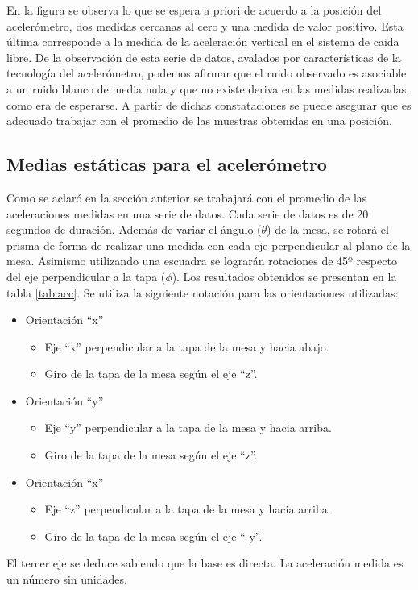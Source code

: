 \documentclass[main]{subfiles}
\begin{document}
En la figura se observa lo que se espera a priori de acuerdo a la posici\'on del aceler\'ometro, dos medidas cercanas al cero y una medida de valor positivo. Esta \'ultima corresponde a la medida de la aceleraci\'on vertical en el sistema de caida libre. De la observaci\'on de esta serie de datos, avalados por características de la tecnología del acelerómetro, podemos afirmar que el ruido observado es asociable a un ruido blanco de media nula y que no existe deriva en las medidas realizadas, como era de esperarse. A partir de dichas constataciones se puede asegurar que es adecuado trabajar con el promedio de las muestras obtenidas en una posici\'on.


\subsection{Medias estáticas para el acelerómetro}

Como se aclaró en la sección anterior se trabajará con el promedio de las aceleraciones medidas en una serie de datos. Cada serie de datos es de 20 segundos de duración. Además de variar el ángulo ($\theta$) de la mesa, se rotará el prisma de forma de realizar una medida con cada eje perpendicular al plano de la mesa. Asimismo utilizando una escuadra se lograrán rotaciones de 45º respecto del eje perpendicular a la tapa ($\phi$). Los resultados obtenidos se presentan en la tabla \ref{tab:acc}. Se utiliza la siguiente notación para las orientaciones utilizadas:
\begin{itemize}
	\item Orientación ``x''
	\begin{itemize}
		\item Eje ``x'' perpendicular a la tapa de la mesa y hacia abajo.
		\item Giro de la tapa de la mesa según el eje ``z''.
	\end{itemize}
	\item Orientación ``y''
	\begin{itemize}
		\item Eje ``y'' perpendicular a la tapa de la mesa y hacia arriba.
		\item Giro de la tapa de la mesa según el eje ``z''.
	\end{itemize}
	\item Orientación ``x''
	\begin{itemize}
		\item Eje ``z'' perpendicular a la tapa de la mesa y hacia arriba.
		\item Giro de la tapa de la mesa según el eje ``-y''.
	\end{itemize}
\end{itemize}
El tercer eje se deduce sabiendo que la base es directa. La aceleración medida es un número sin unidades.
\end{document}
